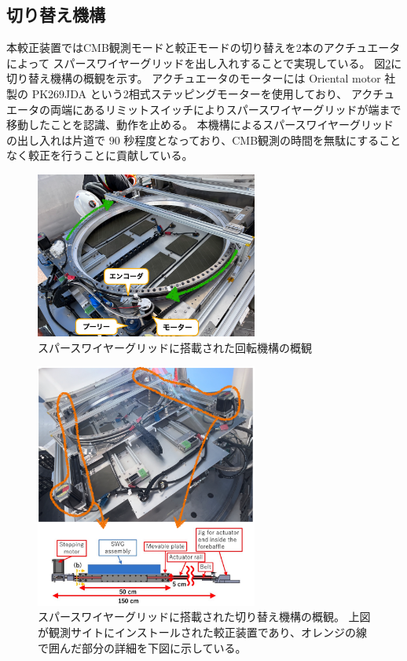 \documentclass[../../main.tex]{subfiles}
\begin{document}
\subsection{切り替え機構}
本較正装置ではCMB観測モードと較正モードの切り替えを2本のアクチュエータによって
スパースワイヤーグリッドを出し入れすることで実現している。
図\ref{fig:gridloader}に切り替え機構の概観を示す。
アクチュエータのモーターには Oriental motor 社製の PK269JDA という2相式ステッピングモーターを使用しており、
アクチュエータの両端にあるリミットスイッチによりスパースワイヤーグリッドが端まで移動したことを認識、動作を止める。
本機構によるスパースワイヤーグリッドの出し入れは片道で $90$ 秒程度となっており、CMB観測の時間を無駄にすることなく較正を行うことに貢献している\cite{swg:nakata}。
\begin{figure}[H]
    \centering
    \includegraphics[width=0.65\textwidth]{wiregrid/rotation_parts.pdf}
    \caption{スパースワイヤーグリッドに搭載された回転機構の概観}
    \label{fig:rotation_parts}
\end{figure}
\begin{figure}[H]
    \centering
    \includegraphics[width=0.65\textwidth]{wiregrid/wiregrid_actuator.pdf}
    \caption[スパースワイヤーグリッドに搭載された切り替え機構の概観]{スパースワイヤーグリッドに搭載された切り替え機構の概観。
    上図が観測サイトにインストールされた較正装置であり、オレンジの線で囲んだ部分の詳細を下図に示している。
    }
    \label{fig:gridloader}
\end{figure}
\end{document}
